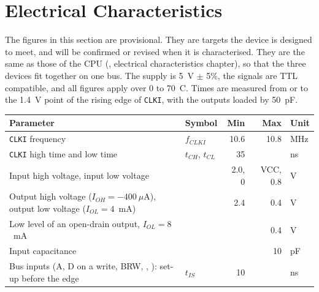\section{Electrical Characteristics}
\label{sec:electrical}

The figures in this section are provisional. They are targets the device is designed to meet, and will be confirmed or
revised when it is characterised. They are the same as those of the CPU (\hwmanual{}, electrical characteristics
chapter), so that the three devices fit together on one bus. The supply is 5~V $\pm$ 5\%, the signals are TTL
compatible, and all figures apply over 0 to 70~\textdegree{}C. Times are measured from or to the 1.4~V point of the
rising edge of \texttt{CLKI}, with the outputs loaded by 50~pF.

\begin{table}[H]
	\centering
	\begin{tabular}{p{7.6cm}lrrl}
		\toprule
		\textbf{Parameter}                                                                         & \textbf{Symbol}    & \textbf{Min} & \textbf{Max} & \textbf{Unit} \\
		\midrule
		\texttt{CLKI} frequency                                                                    & $f_{CLKI}$         & 10.6         & 10.8         & MHz           \\
		\texttt{CLKI} high time and low time                                                       & $t_{CH}$, $t_{CL}$ & 35           &              & ns            \\
		Input high voltage, input low voltage                                                      &                    & 2.0, 0       & VCC, 0.8     & V             \\
		Output high voltage ($I_{OH} = -400~\mu$A), output low voltage ($I_{OL} = 4$~mA)           &                    & 2.4          & 0.4          & V             \\
		Low level of an open-drain output, $I_{OL} = 8$~mA                                         &                    &              & 0.4          & V             \\
		Input capacitance                                                                          &                    &              & 10           & pF            \\
		\midrule
		Bus inputs (A, D on a write, BRW, \activelow{CS}, \activelow{BAS}): set-up before the edge & $t_{IS}$           & 10           &              & ns            \\

\end{tabular}
\end{table}
